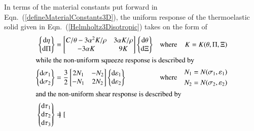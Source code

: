 In terms of the material constants put forward in Eqn.~(\ref{defineMaterialConstants3D}), the uniform response of the thermo\-elastic solid given in Eqn.~(\ref{Helmholtz3Disotropic}) takes on the form of 
\begin{subequations}
    \label{HelmholtzODEs}
    \begin{align}
    \left\{ \begin{matrix}
    \mathrm{d} \eta \\ \mathrm{d} \Pi 
    \end{matrix} \right\} & = \begin{bmatrix}
    C / \theta - 3 \alpha^2 K / \rho & 3 \alpha K / \rho \\
    -3 \alpha K & 9K
    \end{bmatrix} \left\{ \begin{matrix}
    \mathrm{d} \theta \\ \mathrm{d} \Xi 
    \end{matrix} \right\} & 
    \text{where} & & K = K ( \theta , \Pi , \Xi )
    \label{HelmholtzODEsUniform} \\
    \intertext{while the non-uniform squeeze response is described by}
    \left\{ \begin{matrix}
    \mathrm{d} \sigma_1 \\ \mathrm{d} \sigma_2
    \end{matrix} \right\} & = \frac{3}{2} \begin{bmatrix}
    2 N_1 & -N_2 \\
    -N_1 & 2N_2
    \end{bmatrix} \left\{ \begin{matrix}
    \mathrm{d} \varepsilon_1 \\ \mathrm{d} \varepsilon_2
    \end{matrix} \right\} & 
    \text{where} & & \begin{aligned}
    N_1 & = N ( \sigma_1 , \varepsilon_1 ) \\
    N_2 & = N ( \sigma_2 , \varepsilon_2 )
    \end{aligned}
    \label{HelmholtzODEsSqueeze} \\
    \intertext{and the non-uniform shear response is described by}
    \left\{ \begin{matrix}
    \mathrm{d} \tau_1 \\ \mathrm{d} \tau_2 \\ \mathrm{d} \tau_3
    \end{matrix} \right\} & = \begin{bmatrix}

\end{bmatrix}
\end{align}
\end{subequations}
